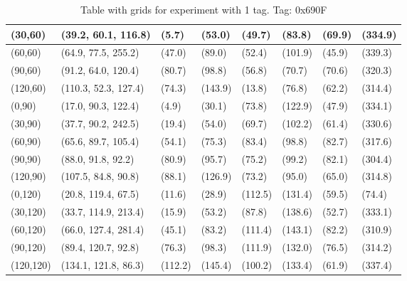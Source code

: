 \begin{table}[H]
\begin{tabular}{|l|l|l|l|l|l|l|l|}
        (30,60)     & (39.2, 60.1, 116.8)   & (5.7)   & (53.0)  & (49.7)  & (83.8)  & (69.9)  & (334.9) \\ \hline
        (60,60)     & (64.9, 77.5, 255.2)   & (47.0)  & (89.0)  & (52.4)  & (101.9) & (45.9)  & (339.3) \\ \hline
        (90,60)     & (91.2, 64.0, 120.4)   & (80.7)  & (98.8)  & (56.8)  & (70.7)  & (70.6)  & (320.3) \\ \hline
        (120,60)    & (110.3, 52.3, 127.4)  & (74.3)  & (143.9) & (13.8)  & (76.8)  & (62.2)  & (314.4) \\ \hline
        (0,90)      & (17.0, 90.3, 122.4)   & (4.9)   & (30.1)  & (73.8)  & (122.9) & (47.9)  & (334.1) \\ \hline
        (30,90)     & (37.7, 90.2, 242.5)   & (19.4)  & (54.0)  & (69.7)  & (102.2) & (61.4)  & (330.6) \\ \hline
        (60,90)     & (65.6, 89.7, 105.4)   & (54.1)  & (75.3)  & (83.4)  & (98.8)  & (82.7)  & (317.6) \\ \hline
        (90,90)     & (88.0, 91.8, 92.2)    & (80.9)  & (95.7)  & (75.2)  & (99.2)  & (82.1)  & (304.4) \\ \hline
        (120,90)    & (107.5, 84.8, 90.8)   & (88.1)  & (126.9) & (73.2)  & (95.0)  & (65.0)  & (314.8) \\ \hline
        (0,120)     & (20.8, 119.4, 67.5)   & (11.6)  & (28.9)  & (112.5) & (131.4) & (59.5)  & (74.4)  \\ \hline
        (30,120)    & (33.7, 114.9, 213.4)  & (15.9)  & (53.2)  & (87.8)  & (138.6) & (52.7)  & (333.1) \\ \hline
        (60,120)    & (66.0, 127.4, 281.4)  & (45.1)  & (83.2)  & (111.4) & (143.1) & (82.2)  & (310.9) \\ \hline
        (90,120)    & (89.4, 120.7, 92.8)   & (76.3)  & (98.3)  & (111.9) & (132.0) & (76.5)  & (314.2) \\ \hline
        (120,120)   & (134.1, 121.8, 86.3)  & (112.2) & (145.4) & (100.2) & (133.4) & (61.9)  & (337.4) \\ \hline
    \end{tabular}
    \label{Tab:one-tag-experiment-result}
    \caption{Table with grids for experiment with 1 tag. Tag: 0x690F}
\end{table}

